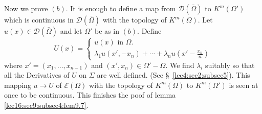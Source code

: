 Now we prove $(b)$. It is enough to define a map from
$\mathscr{D}(\bar{\Omega})$ to $K^m (\Omega')$ which is
continuous in $\mathscr{D} (\bar{\Omega })$ with the topology of
$K^m (\Omega)$. Let $u(x) \in \mathscr{D}
(\bar{\Omega})$ and let $\Omega '$ be as in $(b)$. Define 
$$
U(x) = 
\begin{cases}
  u(x) \text{ in } \Omega . \\
  \lambda_1 u(x', -x_n) + \cdots + \lambda_n u(x ' - \frac{x_n}{n})
\end{cases}
$$
where $x' = (x_1, \ldots , x_{n-1})$ and $(x', x_n) \in \Omega
' - \Omega$. We find $\lambda_i$ suitably so that all the Derivatives
of $U$ on $\Sigma$ are well defined. (See \S\ \ref{lec4:sec2:subsec5}). This mapping $u
\to U $ of $\mathscr{E} (\Omega)$ with the topology of $K^m
(\Omega)$ to $K^m (\Omega ')$ is seen at once to be
continuous. This finishes the poof of lemma \ref{lec16:sec9:subsec4:lem9.7}.  
\begin{figure}[H]
\end{figure}
